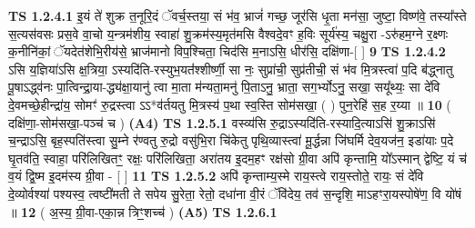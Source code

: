\documentclass[17pt]{extarticle}
\begin{document}
                                        \textbf{ TS 1.2.4.1} \newline
                  इ॒यं ते॑ शुक्र त॒नूरि॒दं ॅवर्च॒स्तया॒ सं भ॑व॒ भ्राजं॑ गच्छ॒ जूर॑सि धृ॒ता मन॑सा॒ जुष्टा॒ विष्ण॑वे॒ तस्या᳚स्ते स॒त्यस॑वसः प्रस॒वे वा॒चो य॒न्त्रम॑शीय॒ स्वाहा॑ शु॒क्रम॑स्य॒मृत॑मसि वैश्वदे॒वꣳ ह॒विः सूर्य॑स्य॒ चक्षु॒रा -ऽरु॑हम॒ग्ने र॒क्ष्णः क॒नीनि॑कां॒ ॅयदेत॑शेभि॒रीय॑से॒ भ्राज॑मानो विप॒श्चिता॒ चिद॑सि म॒नाऽसि॒ धीर॑सि॒ दक्षि॑णा-[ ] \textbf{  9} \newline
                  \newline
                                \textbf{ TS 1.2.4.2} \newline
                  ऽसि य॒ज्ञिया॑ऽसि क्ष॒त्रिया॒ ऽस्यदि॑ति-रस्युभ॒यत॑॑श्शीर्ष्णी॒ सा नः॒ सुप्रा॑ची॒ सुप्र॑तीची॒ सं भ॑व मि॒त्रस्त्वा॑ प॒दि ब॑द्ध्नातु पू॒षाऽद्ध्व॑नः पा॒त्विन्द्रा॒या-द्ध्य॑क्षा॒यानु॑ त्वा मा॒ता म॑न्यता॒मनु॑ पि॒ताऽनु॒ भ्राता॒ सग॒र्भ्योऽनु॒ सखा॒ सयू᳚थ्यः॒ सा दे॑वि दे॒वमच्छे॒हीन्द्रा॑य॒ सोमꣳ॑  रु॒द्रस्त्वा ऽऽ*व॑र्तयतु मि॒त्रस्य॑ प॒था स्व॒स्ति सोम॑सखा॒ ( ) पुन॒रेहि॑ स॒ह र॒य्या ॥ \textbf{  10} \newline
                  \newline
                      ( दक्षि॑णा॒-सोम॑सखा॒-पञ्च॑ च )  \textbf{(A4)} \newline \newline
                                        \textbf{ TS 1.2.5.1} \newline
                  वस्व्य॑सि रु॒द्राऽस्यदि॑ति-रस्यादि॒त्याऽसि॑ शु॒क्राऽसि॑ च॒न्द्राऽसि॒ बृह॒स्पति॑स्त्वा सु॒म्ने र॑ण्वतु रु॒द्रो वसु॑भि॒रा चि॑केतु पृथि॒व्यास्त्वा॑ मू॒र्द्धन्ना जि॑घर्मि देव॒यज॑न॒ इडा॑याः प॒दे घृ॒तव॑ति॒ स्वाहा॒ परि॑लिखितꣳ॒॒ रक्षः॒ परि॑लिखिता॒ अरा॑तय इ॒दम॒हꣳ रक्ष॑सो ग्री॒वा अपि॑ कृन्तामि॒ यो᳚ऽस्मान् द्वेष्टि॒ यं च॑ व॒यं द्वि॒ष्म इ॒दम॑स्य ग्री॒वा - [ ] \textbf{  11} \newline
                  \newline
                                \textbf{ TS 1.2.5.2} \newline
                  अपि॑ कृन्ताम्य॒स्मे राय॒स्त्वे राय॒स्तोते॒ रायः॒ सं दे॑वि दे॒व्योर्वश्या॑ पश्यस्व॒ त्वष्टी॑मती ते सपेय सु॒रेता॒ रेतो॒ दधा॑ना वी॒रं ॅवि॑देय॒ तव॑ स॒न्दृशि॒ माऽहꣳरा॒यस्पोषे॑ण॒ वि यो॑षं ॥ \textbf{  12} \newline
                  \newline
                      ( अ॒स्य॒ ग्री॒वा-एका॒न्न त्रिꣳ॒॒शच्च॑ )  \textbf{(A5)} \newline \newline
                                        \textbf{ TS 1.2.6.1} \newline
\end{document}
